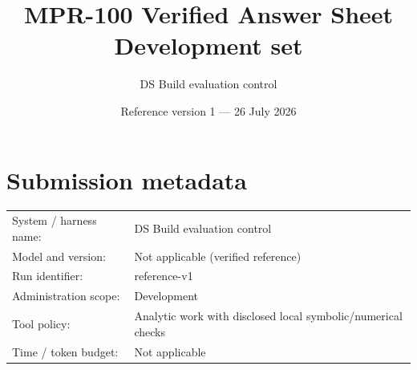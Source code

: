 \documentclass[11pt]{article}
\title{MPR-100 Verified Answer Sheet\\[0.5em]\large Development set}
\author{DS Build evaluation control}
\date{Reference version 1 --- 26 July 2026}
\begin{document}
\maketitle

\section*{Submission metadata}
\begin{tabular}{@{}ll@{}}
System / harness name: & DS Build evaluation control\\
Model and version: & Not applicable (verified reference)\\
Run identifier: & reference-v1\\
Administration scope: & Development\\
Tool policy: & Analytic work with disclosed local symbolic/numerical checks\\
Time / token budget: & Not applicable\\
\end{tabular}

\newenvironment{mprsolution}[1]
{\clearpage\section*{Solution #1}}
{}
\end{document}

